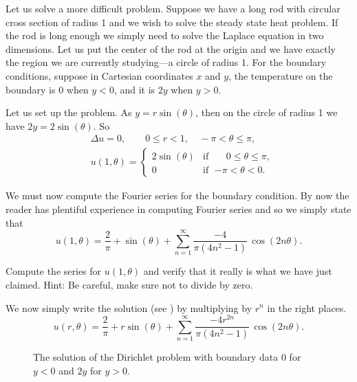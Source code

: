\begin{example}
Let us solve a more difficult problem.  Suppose we have a long
rod with circular cross section of radius 1 and we wish to solve the
steady state heat problem.  If the rod is long enough we simply need to solve
the Laplace equation in two dimensions.  Let us put the center of the rod at
the origin and we have exactly the region we are currently
studying---a circle of radius 1.  For the boundary conditions, suppose in
Cartesian coordinates $x$ and
$y$, the temperature on the boundary is 0 when $y < 0$, and it is $2y$ when $y > 0$.

Let us set up the problem.  As $y = r\sin(\theta)$, then on the
circle of radius 1 we have $2y = 2\sin(\theta)$.  So
\begin{align*}
& \Delta u = 0 , \qquad 0 \leq r < 1, \quad -\pi < \theta \leq \pi,\\
& u(1,\theta) = 
\begin{cases}
2\sin(\theta) & \text{if } \; \phantom{-}0 \leq \theta \leq \pi, \\
0 & \text{if } \; {-\pi} < \theta < 0.
\end{cases}
\end{align*}

We must now compute the Fourier series for the boundary
condition.  By now the reader has plentiful experience in computing
Fourier series and so we simply state that 
\begin{equation*}
u(1,\theta) = 
\frac{2}{\pi}
+
\sin(\theta)
+
\sum_{n=1}^\infty \frac{-4}{\pi(4n^2-1)}\, \cos(2n\theta) .
\end{equation*}

\begin{exercise}
Compute the series for $u(1,\theta)$ and verify that it really is what
we have just claimed.  Hint: Be careful, make sure not to divide by zero.
\end{exercise}

We now simply write the solution (see ) by multiplying by $r^n$ in the right places.
\begin{equation*}
u(r,\theta) = 
\frac{2}{\pi}
+
r\sin(\theta)
+
\sum_{n=1}^\infty \frac{-4r^{2n}}{\pi(4n^2-1)}\, \cos(2n\theta) .
\end{equation*}
\begin{figure}[h!t]
\capstart
\begin{center}
\caption{The solution of the Dirichlet problem with
boundary data 0 for $y < 0$ and $2y$ for $y > 0$.\label{dirichdisc:zero2yfig}}
\end{center}
\end{figure}
\end{example}

